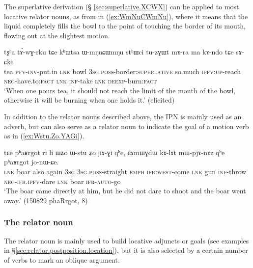 The superlative derivation (§ \ref{sec:superlative.XCWX}) can be applied to most locative relator nouns, as  from   in (\ref{ex:WmNuCWmNu}), where it means that the liquid completely fills the bowl to the point of touching the border of its mouth, flowing out at the slightest motion.

\begin{exe}
\ex \label{ex:WmNuCWmNu}
\gll  tʂʰa tɤ́-wɣ-rku tɕe kʰɯtsa ɯ-mŋuɕɯmŋu stʰɯci tu-zɣɯt mɤ-ra ma kɤ-ndo tɕe sɤ-ɕke \\
tea \textsc{pfv}-\textsc{inv}-put.in \textsc{lnk} bowl \textsc{3sg}.\textsc{poss}-border:\textsc{superlative} so.much \textsc{ipfv}:\textsc{up}-reach \textsc{neg}-have.to:\textsc{fact} \textsc{lnk} \textsc{inf}-take \textsc{lnk} \textsc{deexp}-burn:\textsc{fact} \\
\glt `When one pours tea, it should not reach the limit of the mouth of the bowl, otherwise it will be burning when one holds it.' (elicited)
\end{exe} 

In addition to the relator nouns described above, the IPN  is mainly used as an adverb, but can also serve as a relator noun to indicate the goal of a motion verb as in (\ref{ex:Wstu.Zo.YAGi}).

\begin{exe}
\ex \label{ex:Wstu.Zo.YAGi}
\gll  tɕe pʰaʁrgot ri li ɯʑo ɯ-stu ʑo ɲɤ-ɣi qʰe,  ɕɤmɯɣdɯ kɤ-lɤt mɯ-pjɤ-nɤz qʰe pʰaʁrgot jo-nɯ-ɕe. \\
\textsc{lnk} boar also again \textsc{3sg} \textsc{3sg}.\textsc{poss}-straight \textsc{emph} \textsc{ifr}:\textsc{west}-come \textsc{lnk} gun \textsc{inf}-throw \textsc{neg}-\textsc{ifr}.\textsc{ipfv}-dare \textsc{lnk} boar \textsc{ifr}-\textsc{auto}-go \\
\glt `The boar came directly at him, but he did not dare to shoot and the boar went away.' (150829 phaRrgot, 8)
\end{exe} 

\subsubsection{The relator noun } \label{sec:WtaR}
The relator noun  is mainly used to build locative adjuncts or goals (see examples in §\ref{sec:relator.postposition.location}), but it is also selected by a certain number of verbs to mark an oblique argument.

